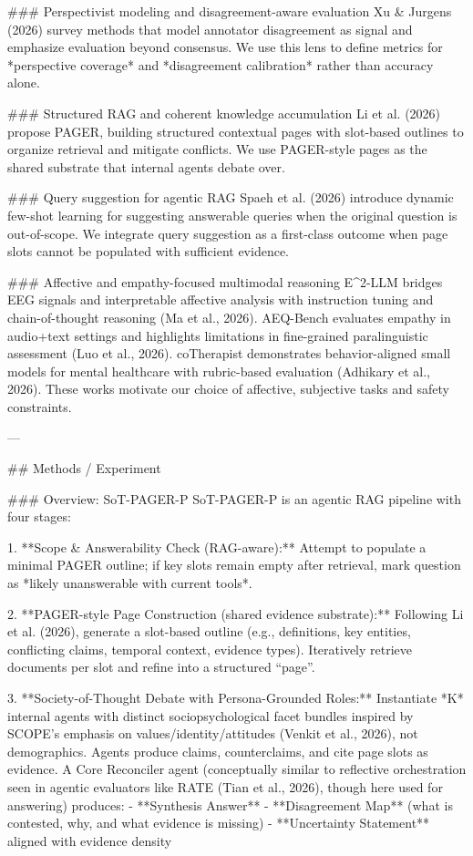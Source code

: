### Perspectivist modeling and disagreement-aware evaluation  
Xu & Jurgens (2026) survey methods that model annotator disagreement as signal and emphasize evaluation beyond consensus. We use this lens to define metrics for *perspective coverage* and *disagreement calibration* rather than accuracy alone.

### Structured RAG and coherent knowledge accumulation  
Li et al. (2026) propose PAGER, building structured contextual pages with slot-based outlines to organize retrieval and mitigate conflicts. We use PAGER-style pages as the shared substrate that internal agents debate over.

### Query suggestion for agentic RAG  
Spaeh et al. (2026) introduce dynamic few-shot learning for suggesting answerable queries when the original question is out-of-scope. We integrate query suggestion as a first-class outcome when page slots cannot be populated with sufficient evidence.

### Affective and empathy-focused multimodal reasoning  
E^2-LLM bridges EEG signals and interpretable affective analysis with instruction tuning and chain-of-thought reasoning (Ma et al., 2026). AEQ-Bench evaluates empathy in audio+text settings and highlights limitations in fine-grained paralinguistic assessment (Luo et al., 2026). coTherapist demonstrates behavior-aligned small models for mental healthcare with rubric-based evaluation (Adhikary et al., 2026). These works motivate our choice of affective, subjective tasks and safety constraints.

---

## Methods / Experiment  

### Overview: SoT-PAGER-P  
SoT-PAGER-P is an agentic RAG pipeline with four stages:

1. **Scope & Answerability Check (RAG-aware):**  
   Attempt to populate a minimal PAGER outline; if key slots remain empty after retrieval, mark question as *likely unanswerable with current tools*.

2. **PAGER-style Page Construction (shared evidence substrate):**  
   Following Li et al. (2026), generate a slot-based outline (e.g., definitions, key entities, conflicting claims, temporal context, evidence types). Iteratively retrieve documents per slot and refine into a structured “page”.

3. **Society-of-Thought Debate with Persona-Grounded Roles:**  
   Instantiate *K* internal agents with distinct sociopsychological facet bundles inspired by SCOPE’s emphasis on values/identity/attitudes (Venkit et al., 2026), not demographics. Agents produce claims, counterclaims, and cite page slots as evidence. A Core Reconciler agent (conceptually similar to reflective orchestration seen in agentic evaluators like RATE (Tian et al., 2026), though here used for answering) produces:
   - **Synthesis Answer**
   - **Disagreement Map** (what is contested, why, and what evidence is missing)
   - **Uncertainty Statement** aligned with evidence density

